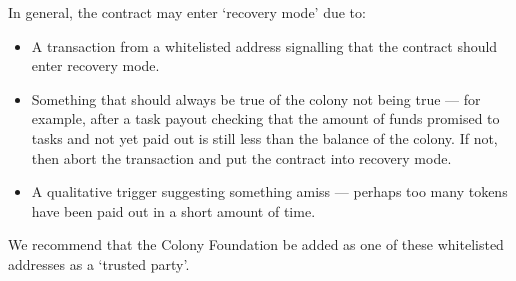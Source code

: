 In general, the contract may enter `recovery mode' due to:
\begin{itemize}
 \item A transaction from a whitelisted address signalling that the contract should enter recovery mode.
 \item Something that should always be true of the colony not being true --- for example, after a task payout checking that the amount of funds promised to tasks and not yet paid out is still less than the balance of the colony. If not, then abort the transaction and put the contract into recovery mode.
 \item A qualitative trigger suggesting something amiss --- perhaps too many tokens have been paid out in a short amount of time.
\end{itemize}

We recommend that the Colony Foundation be added as one of these whitelisted addresses as a `trusted party'.
